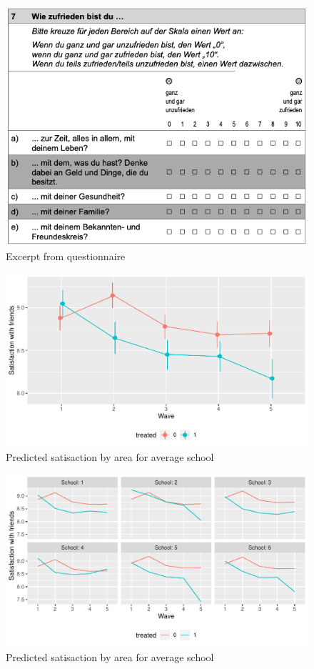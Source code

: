 \documentclass[a4, 12pt]{article}
\begin{document}
\begin{figure}[H]

{\centering \includegraphics[width=0.8\linewidth,]{../figures/questionnaire_satisfaction} 

}

\caption{Excerpt from questionnaire}\label{fig:questionnaire}
\end{figure}
\begin{figure}[H]

{\centering \includegraphics[width=0.8\linewidth,]{../figures/sat_friends_pred} 

}

\caption{Predicted satisaction by area for average school}\label{fig:sat-friends-pred}
\end{figure}
\begin{figure}[H]

{\centering \includegraphics[width=0.8\linewidth,]{../figures/sat_friends_pred_across_schools} 

}

\caption{Predicted satisaction by area for average school}\label{fig:sat-friends-pred-across-schools}
\end{figure}
\end{document}
